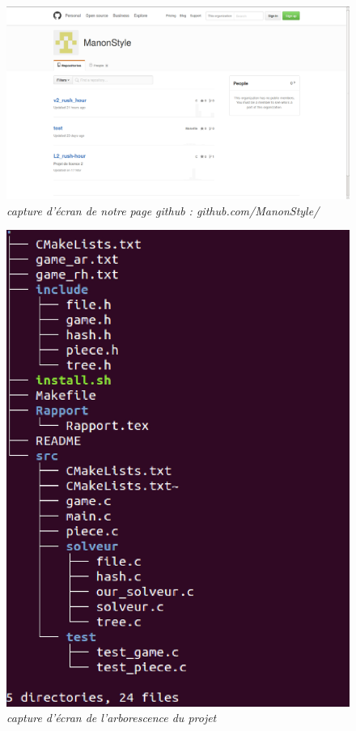 \documentclass{report}
\begin{document}
\begin{figure}
\begin{center}
\includegraphics[scale = 0.4, angle = 90]{github.eps}
\end{center}
\caption{\textit{capture d'écran de notre page github : github.com/ManonStyle/}}
\label{github}
\end{figure}

\begin{figure}
\begin{center}
\includegraphics[scale = 1]{structure.eps}
\end{center}
\caption{\textit{capture d'écran de l'arborescence du projet}}
\label{arbor}
\end{figure}
\end{document}

